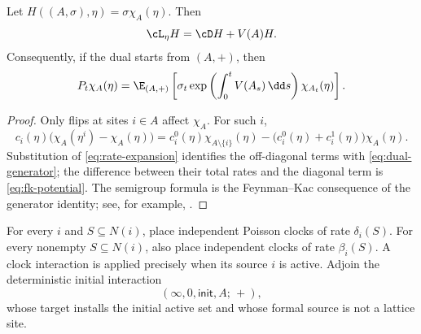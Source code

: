 \begin{theorem}
\label{thm:monomial-duality}
Let \(H((A,\sigma),\eta)=\sigma\chi_A(\eta)\). Then
\[
  \cL_\eta H=\cD H+V(A)H.
\]
Consequently, if the dual starts from \((A,+)\), then
\begin{equation}
  P_t\chi_A(\eta)
  =
  \E_{(A,+)}\left[
    \sigma_t
    \exp\left(\int_0^tV(A_s)\,\dd s\right)
    \chi_{A_t}(\eta)
  \right].
  \label{eq:fk-duality}
\end{equation}
\end{theorem}

\begin{proof}
Only flips at sites \(i\in A\) affect \(\chi_A\). For such \(i\),
\[
  c_i(\eta)\bigl(\chi_A(\eta^i)-\chi_A(\eta)\bigr)
  =
  c_i^0(\eta)\chi_{A\setminus\{i\}}(\eta)
  -
  \bigl(c_i^0(\eta)+c_i^1(\eta)\bigr)\chi_A(\eta).
\]
Substitution of \eqref{eq:rate-expansion} identifies the off-diagonal
terms with \eqref{eq:dual-generator}; the difference between their
total rates and the diagonal term is \eqref{eq:fk-potential}. The
semigroup formula is the Feynman--Kac consequence of the generator
identity; see, for example, \citet{jansen-kurt2014}.
\end{proof}

\begin{construction}
\label{con:dual-graphical}
For every \(i\) and \(S\subseteq N(i)\), place independent Poisson
clocks of rate \(\delta_i(S)\). For every nonempty
\(S\subseteq N(i)\), also place independent clocks of rate
\(\beta_i(S)\). A clock interaction is applied precisely when its
source \(i\) is active. Adjoin the deterministic initial interaction
\[
  (\infty,0,\mathsf{init},A;\,+),
\]
whose target installs the initial active set and whose formal source
is not a lattice site.
\end{construction}
